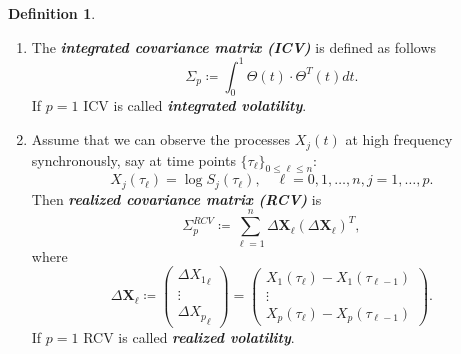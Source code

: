 \documentclass[a4paper,11pt]{book}
\theoremstyle{plain}
\theoremstyle{definition}
\newtheorem{defn}[thm]{Definition}
\newcommand{\define}[1]{\textit{\textbf{#1}}}
\begin{document}
	\begin{defn} \
		\begin{enumerate}
			\item The \define{integrated covariance matrix (ICV)} is defined as follows
			\[\Sigma_p \coloneqq \int_0^1\Theta(t) \cdot \Theta^T(t) dt.\]
			If $p=1$ ICV is called \define{integrated volatility}.
			\item Assume that we can observe the processes $X_j(t)$ at high frequency synchronously, say at time points $ \{\tau_\ell\}_{0 \leq \ell \leq n}$:
			\[ X_j(\tau_\ell) = \log S_j(\tau_\ell), \quad \ell = 0, 1, \dots, n, j = 1, \dots, p. \]
			 Then \define{realized covariance matrix (RCV)} is
			\begin{equation} \label{RCV}
				\Sigma_p^{RCV} \coloneqq \sum_{\ell=1}^{n}\Delta \mathbf{X}_\ell(\Delta \mathbf{X}_\ell)^T,
			\end{equation}
			where 
			\[ \Delta \mathbf{X}_\ell \coloneqq
			\begin{pmatrix}
			\Delta {X_1}_\ell \\
			\vdots \\
			\Delta {X_p}_\ell
			\end{pmatrix}
			=
			\begin{pmatrix}
			X_1(\tau_{\ell}) - X_1(\tau_{\ell-1}) \\
			\vdots \\
			X_p(\tau_{\ell}) - X_p(\tau_{\ell-1})
			\end{pmatrix}. \]
			If $p=1$ RCV is called \define{realized volatility}.
		\end{enumerate}
	\end{defn}
	
\end{document}
